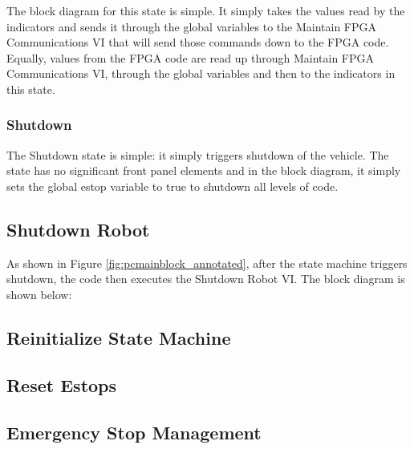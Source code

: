 \noindent The block diagram for this state is simple. It simply takes the values read by the indicators and sends it through the global variables to the Maintain FPGA Communications VI that will send those commands down to the FPGA code. Equally, values from the FPGA code are read up through Maintain FPGA Communications VI, through the global variables and then to the indicators in this state.

\subsubsection{Shutdown}

The Shutdown state is simple: it simply triggers shutdown of the vehicle. The state has no significant front panel elements and in the block diagram, it simply sets the global estop variable to true to shutdown all levels of code.

\subsection{Shutdown Robot}

As shown in Figure \ref{fig:pcmainblock_annotated}, after the state machine triggers shutdown, the code then executes the Shutdown Robot VI. The block diagram is shown below:


\subsection{Reinitialize State Machine}
\subsection{Reset Estops}
\subsection{Emergency Stop Management}